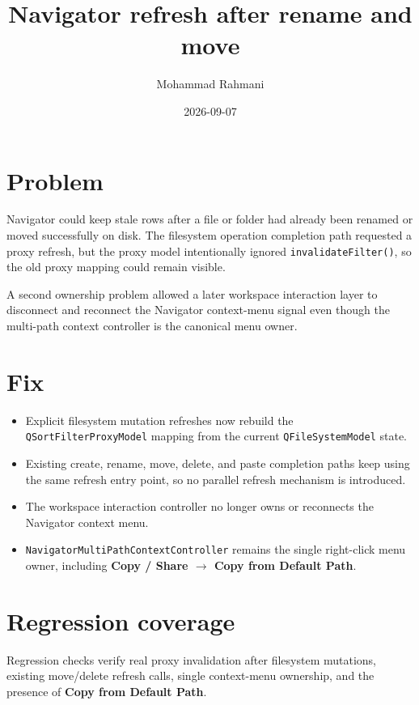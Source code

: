 \documentclass[a4paper]{article}
\title{Navigator refresh after rename and move}
\date{2026-09-07}
\author{Mohammad Rahmani}
\begin{document}
\maketitle

\section{Problem}
Navigator could keep stale rows after a file or folder had already been renamed
or moved successfully on disk. The filesystem operation completion path
requested a proxy refresh, but the proxy model intentionally ignored
\texttt{invalidateFilter()}, so the old proxy mapping could remain visible.

A second ownership problem allowed a later workspace interaction layer to
disconnect and reconnect the Navigator context-menu signal even though the
multi-path context controller is the canonical menu owner.

\section{Fix}
\begin{itemize}
   \item Explicit filesystem mutation refreshes now rebuild the
   \texttt{QSortFilterProxyModel} mapping from the current
   \texttt{QFileSystemModel} state.
   \item Existing create, rename, move, delete, and paste completion paths keep
   using the same refresh entry point, so no parallel refresh mechanism is
   introduced.
   \item The workspace interaction controller no longer owns or reconnects the
   Navigator context menu.
   \item \texttt{NavigatorMultiPathContextController} remains the single
   right-click menu owner, including
   \textbf{Copy / Share $\rightarrow$ Copy from Default Path}.
\end{itemize}

\section{Regression coverage}
Regression checks verify real proxy invalidation after filesystem mutations,
existing move/delete refresh calls, single context-menu ownership, and the
presence of \textbf{Copy from Default Path}.
\end{document}
